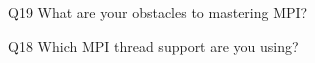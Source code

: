\begin{description}%
\item{Q19} What are your obstacles to mastering MPI?%
\item{Q18} Which MPI thread support are you using?%
\end{description}%

